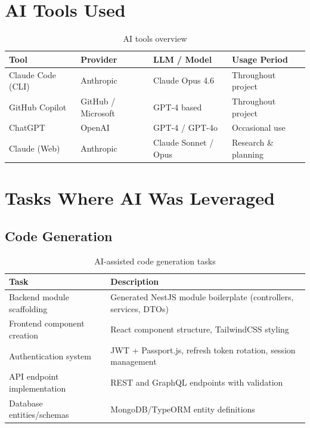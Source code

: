 \documentclass[12pt,a4paper]{article}
\begin{document}
\section{AI Tools Used}

\begin{table}[H]
\centering
\begin{tabularx}{\textwidth}{llXl}
\toprule
\textbf{Tool} & \textbf{Provider} & \textbf{LLM / Model} & \textbf{Usage Period} \\
\midrule
Claude Code (CLI) & Anthropic         & Claude Opus 4.6      & Throughout project \\
GitHub Copilot    & GitHub / Microsoft & GPT-4 based          & Throughout project \\
ChatGPT           & OpenAI            & GPT-4 / GPT-4o       & Occasional use \\
Claude (Web)      & Anthropic         & Claude Sonnet / Opus  & Research \& planning \\
\bottomrule
\end{tabularx}
\caption{AI tools overview}
\end{table}

\section{Tasks Where AI Was Leveraged}

\subsection{Code Generation}

\begin{table}[H]
\centering
\begin{tabularx}{\textwidth}{lX}
\toprule
\textbf{Task} & \textbf{Description} \\
\midrule
Backend module scaffolding  & Generated NestJS module boilerplate (controllers, services, DTOs) \\
Frontend component creation & React component structure, TailwindCSS styling \\
Authentication system       & JWT + Passport.js, refresh token rotation, session management \\
API endpoint implementation & REST and GraphQL endpoints with validation \\
Database entities/schemas   & MongoDB/TypeORM entity definitions \\
\bottomrule
\end{tabularx}
\caption{AI-assisted code generation tasks}
\end{table}
\end{document}
